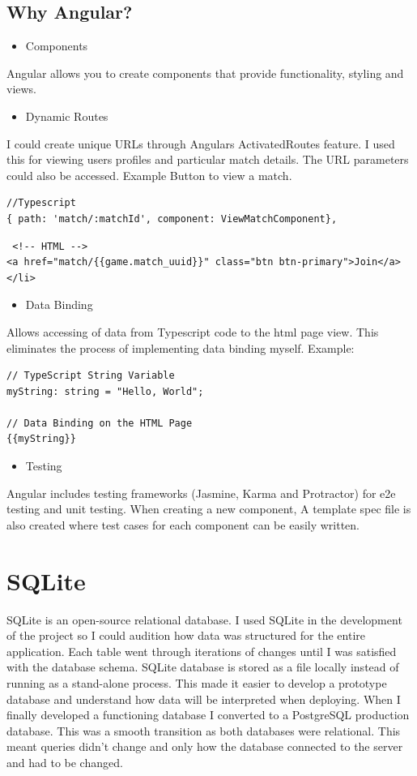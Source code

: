 \subsection{Why Angular?}

\begin{itemize}
	\item Components
\end{itemize}
Angular allows you to create components that provide functionality, styling and views.

\begin{itemize}
	\item Dynamic Routes
\end{itemize}
I could create unique URLs through Angulars ActivatedRoutes feature. I used this for viewing users profiles and particular match details. The URL parameters could also be accessed.
\newpage Example Button to view a match.
\begin{verbatim}
//Typescript
{ path: 'match/:matchId', component: ViewMatchComponent},
\end{verbatim}
\begin{verbatim}
 <!-- HTML -->
<a href="match/{{game.match_uuid}}" class="btn btn-primary">Join</a></li>
\end{verbatim}

\begin{itemize}
	\item Data Binding
\end{itemize}
Allows accessing of data from Typescript code to the html page view. This eliminates the process of implementing data binding myself.
Example:
\begin{verbatim}
// TypeScript String Variable
myString: string = "Hello, World";

// Data Binding on the HTML Page
{{myString}}
\end{verbatim}

\begin{itemize}
	\item Testing
\end{itemize}
Angular includes testing frameworks (Jasmine, Karma and Protractor) for e2e testing and unit testing. When creating a new component, A template spec file is also created where test cases for each component can be easily written.

\section{SQLite}
SQLite is an open-source relational database. I used SQLite in the development of the project so I could audition how data was structured for the entire application. Each table went through iterations of changes until I was satisfied with the database schema. SQLite database is stored as a file locally \cite{newman2004sqlite} instead of running as a stand-alone process.
This made it easier to develop a prototype database and understand how data will be interpreted when deploying.
When I finally developed a functioning database I converted to a PostgreSQL production database. This was a smooth transition as both databases were relational. This meant queries didn't change and only how the database connected to the server and had to be changed.

